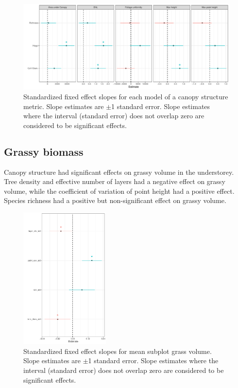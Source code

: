 \documentclass[11pt,a4paper]{article}
\begin{document}
\begin{figure}[H]
\centering
	\includegraphics[width=\textwidth]{height_profile_mod_rich_slopes}
	\caption{Standardized fixed effect slopes for each model of a canopy structure metric. Slope estimates are $\pm$1 standard error. Slope estimates where the interval (standard error) does not overlap zero are considered to be significant effects.}
	\label{height_profile_mod_rich_slopes}
\end{figure}

\subsection{Grassy biomass}

Canopy structure had significant effects on grassy volume in the understorey. Tree density and effective number of layers had a negative effect on grassy volume, while the coefficient of variation of point height had a positive effect. Species richness had a positive but non-significant effect on grassy volume.

\begin{figure}[H]
\centering
	\includegraphics[width=0.4\textwidth]{grass_vol_best_mod_slopes}
	\caption{Standardized fixed effect slopes for mean subplot grass volume. Slope estimates are $\pm$1 standard error. Slope estimates where the interval (standard error) does not overlap zero are considered to be significant effects.}
	\label{grass_vol_best_mod_slopes}
\end{figure}
\end{document}
